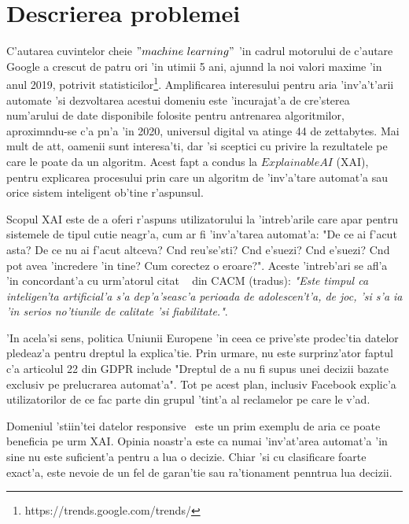 \documentclass[12pt,a4paper,twoside]{report}
\begin{document}
\section{Descrierea problemei}

C'autarea cuvintelor cheie $"machine\ learning"$ 'in cadrul motorului de c'autare Google a crescut de patru ori 'in utimii 5 ani, ajun\ia nd la noi valori maxime 'in anul 2019, potrivit statisticilor\footnote{https://trends.google.com/trends/}. Amplificarea interesului pentru aria 'inv'a't'arii automate 'si dezvoltarea acestui domeniu este 'incurajat'a de cre'sterea num'arului de date disponibile folosite pentru antrenarea algoritmilor, aproxim\ia ndu-se c'a p\ia n'a 'in 2020, universul digital va atinge 44 de zettabytes. Mai mult de at\ia t, oamenii sunt interesa'ti, dar 'si sceptici cu privire la rezultatele pe care le poate da un algoritm. Acest fapt a condus la $Explainable AI$ (XAI), pentru explicarea procesului prin care un algoritm de 'inv'a'tare automat'a sau orice sistem inteligent ob'tine r'aspunsul.

Scopul XAI este de a oferi r'aspuns utilizatorului la 'intreb'arile care apar pentru sistemele de tipul cutie neagr'a, cum ar fi 'inv'a'tarea automat'a: "De ce ai f'acut asta? De ce nu ai f'acut altceva? C\ia nd reu'se'sti? C\ia nd e'suezi? C\ia nd e'suezi? C\ia nd pot avea 'incredere 'in tine? Cum corectez o eroare?". Aceste 'intreb'ari se afl'a 'in concordant'a cu urm'atorul citat ~\cite{monroe2018ai} din CACM (tradus): {\it "Este timpul ca inteligen'ta artificial'a s'a dep'a'seasc'a perioada de adolescen't'a, de joc, 'si s'a ia 'in serios no'tiunile de calitate 'si fiabilitate."}.

'In acela'si sens, politica Uniunii Europene 'in ceea ce prive'ste prodec'tia datelor pledeaz'a pentru dreptul la explica'tie. Prin urmare, nu este surprinz'ator faptul c'a articolul 22 din GDPR include "Dreptul de a nu fi supus unei decizii bazate exclusiv pe prelucrarea automat'a". Tot pe acest plan, inclusiv Facebook explic'a utilizatorilor de ce fac parte din grupul 'tint'a al reclamelor pe care le v'ad. 

Domeniul 'stiin'tei datelor responsive~\cite{van2017responsible} este un prim exemplu de aria ce poate beneficia pe urm XAI. Opinia noastr'a este ca numai 'inv'at'area automat'a 'in sine nu este suficient'a pentru a lua o decizie. Chiar 'si cu clasificare foarte exact'a, este nevoie de un fel de garan'tie sau ra'tionament penntrua lua decizii.
\end{document}
